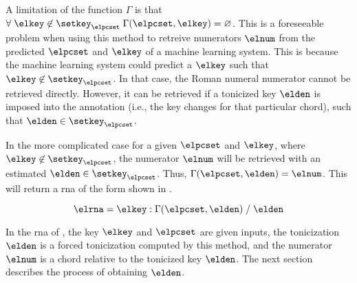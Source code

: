 A limitation of the function $\Gamma$ is that $\forall \;
\elkey \not\in \setkey_\elpcset \; \Gamma(\elpcset, \elkey)
= \varnothing$. This is a foreseeable problem when using
this method to retreive numerators $\elnum$ from the
predicted $\elpcset$ and $\elkey$ of a machine learning
system. This is because the machine learning system could
predict a $\elkey$ such that $\elkey \not\in
\setkey_\elpcset$. In that case, the Roman numeral numerator
cannot be retrieved directly. However, it can be retrieved
if a tonicized key $\elden$ is imposed into the annotation
(i.e., the key changes for that particular chord), such that
$\elden \in \setkey_\elpcset$.

In the more complicated case for a given $\elpcset$ and
$\elkey$, where $\elkey \not\in \setkey_\elpcset$, the
numerator $\elnum$ will be retrieved with an estimated
$\elden \in \setkey_\elpcset$. Thus, $\Gamma(\elpcset,
\elden) = \elnum$. This will return a \gls{rna} of the form
shown in .

\begin{equation}
    \label{eq:numerator_from_pcset_den}
    \elrna = 
    \elkey \; \text{:} \; \Gamma(\elpcset, \elden) \; \text{/} \; \elden
\end{equation}

In the \gls{rna} of , the
key $\elkey$ and $\elpcset$ are given inputs, the
tonicization $\elden$ is a forced tonicization computed by
this method, and the numerator $\elnum$ is a chord relative
to the tonicized key $\elden$. The next section describes
the process of obtaining $\elden$.
